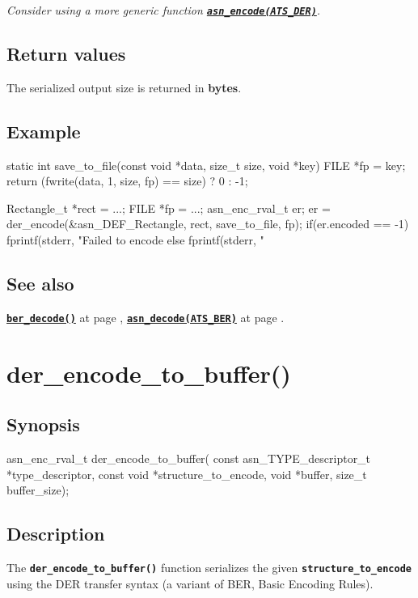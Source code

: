 \documentclass[english,oneside,12pt]{book}
\newcommand{\apisection}[2]{\clearpage\section{\label{#1}#2}}
\newcommand{\api}[2]{\hyperref[#1]{\code{#2}}}
\newcommand{\seealso}[2]{\api{#1}{#2} at page \pageref{#1}}
\newcommand{\code}[1]{\texttt{\textbf{\lstinline{#1}}}}
\begin{document}
\noindent\emph{Consider using a more generic function \api{sec:asn_encode}{asn_encode(ATS_DER)}.}

\subsection*{Return values}


The serialized output size is returned in \textbf{bytes}.

\subsection*{Example}
\begin{example}
static int
save_to_file(const void *data, size_t size, void *key) {
    FILE *fp = key;
    return (fwrite(data, 1, size, fp) == size) ? 0 : -1;
}

Rectangle_t *rect = ...;
FILE *fp = ...;
asn_enc_rval_t er;
er = der_encode(&asn_DEF_Rectangle, rect, save_to_file, fp);
if(er.encoded == -1) {
   fprintf(stderr, "Failed to encode %
} else {
   fprintf(stderr, "%
}
\end{example}

\subsection*{See also}
\seealso{sec:ber_decode}{ber_decode()},
\seealso{sec:asn_decode}{asn_decode(ATS_BER)}.

\apisection{sec:der_encode_to_buffer}{der\_encode\_to\_buffer()}

\subsection*{Synopsis}

\begin{signature}
asn_enc_rval_t der_encode_to_buffer(
    const asn_TYPE_descriptor_t *type_descriptor,
    const void *structure_to_encode,
    void *buffer, size_t buffer_size);
\end{signature}

\subsection*{Description}

The \code{der_encode_to_buffer()} function serializes the given \code{structure_to_encode} using the DER transfer syntax (a variant of BER, Basic Encoding Rules).
\end{document}
